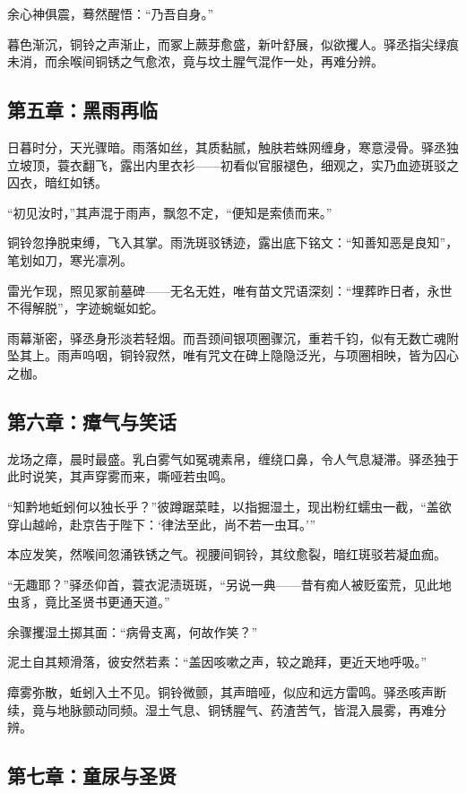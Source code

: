 \documentclass{article}
\begin{document}
	余心神俱震，蓦然醒悟：“乃吾自身。”
	
	暮色渐沉，铜铃之声渐止，而冢上蕨芽愈盛，新叶舒展，似欲攫人。驿丞指尖绿痕未消，而余喉间铜锈之气愈浓，竟与坟土腥气混作一处，再难分辨。
	
	\subsection{第五章：黑雨再临}
	
	日暮时分，天光骤暗。雨落如丝，其质黏腻，触肤若蛛网缠身，寒意浸骨。驿丞独立坡顶，蓑衣翻飞，露出内里衣衫——初看似官服褪色，细观之，实乃血迹斑驳之囚衣，暗红如锈。
	
	“初见汝时，”其声混于雨声，飘忽不定，“便知是索债而来。”
	
	铜铃忽挣脱束缚，飞入其掌。雨洗斑驳锈迹，露出底下铭文：“知善知恶是良知”，笔划如刀，寒光凛冽。
	
	雷光乍现，照见冢前墓碑——无名无姓，唯有苗文咒语深刻：“埋葬昨日者，永世不得解脱”，字迹蜿蜒如蛇。
	
	雨幕渐密，驿丞身形淡若轻烟。而吾颈间银项圈骤沉，重若千钧，似有无数亡魂附坠其上。雨声呜咽，铜铃寂然，唯有咒文在碑上隐隐泛光，与项圈相映，皆为囚心之枷。
	
	\subsection{第六章：瘴气与笑话}
	
	龙场之瘴，晨时最盛。乳白雾气如冤魂素帛，缠绕口鼻，令人气息凝滞。驿丞独于此时说笑，其声穿雾而来，嘶哑若虫鸣。
	
	“知黔地蚯蚓何以独长乎？”彼蹲踞菜畦，以指掘湿土，现出粉红蠕虫一截，“盖欲穿山越岭，赴京告于陛下：‘律法至此，尚不若一虫耳。’”
	
	本应发笑，然喉间忽涌铁锈之气。视腰间铜铃，其纹愈裂，暗红斑驳若凝血痂。
	
	“无趣耶？”驿丞仰首，蓑衣泥渍斑斑，“另说一典——昔有痴人被贬蛮荒，见此地虫豸，竟比圣贤书更通天道。”
	
	余骤攫湿土掷其面：“病骨支离，何故作笑？”
	
	泥土自其颊滑落，彼安然若素：“盖因咳嗽之声，较之跪拜，更近天地呼吸。”
	
	瘴雾弥散，蚯蚓入土不见。铜铃微颤，其声暗哑，似应和远方雷鸣。驿丞咳声断续，竟与地脉颤动同频。湿土气息、铜锈腥气、药渣苦气，皆混入晨雾，再难分辨。
	
	\subsection{第七章：童尿与圣贤}
	
\end{document}
